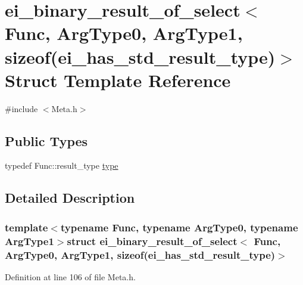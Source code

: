 \hypertarget{structei__binary__result__of__select_3_01_func_00_01_arg_type0_00_01_arg_type1_00_01sizeof_07ei__has__std__result__type_08_4}{\section{ei\-\_\-binary\-\_\-result\-\_\-of\-\_\-select$<$ Func, Arg\-Type0, Arg\-Type1, sizeof(ei\-\_\-has\-\_\-std\-\_\-result\-\_\-type)$>$ Struct Template Reference}
\label{structei__binary__result__of__select_3_01_func_00_01_arg_type0_00_01_arg_type1_00_01sizeof_07ei__has__std__result__type_08_4}
}


{\ttfamily \#include $<$Meta.\-h$>$}

\subsection*{Public Types}
\begin{DoxyCompactItemize}
\item 
typedef Func\-::result\-\_\-type \hyperlink{structei__binary__result__of__select_3_01_func_00_01_arg_type0_00_01_arg_type1_00_01sizeof_07ei__has__std__result__type_08_4_a8db90284ccced2b19045cf284ee2299d}{type}
\end{DoxyCompactItemize}


\subsection{Detailed Description}
\subsubsection*{template$<$typename Func, typename Arg\-Type0, typename Arg\-Type1$>$struct ei\-\_\-binary\-\_\-result\-\_\-of\-\_\-select$<$ Func, Arg\-Type0, Arg\-Type1, sizeof(ei\-\_\-has\-\_\-std\-\_\-result\-\_\-type)$>$}



Definition at line 106 of file Meta.\-h.



